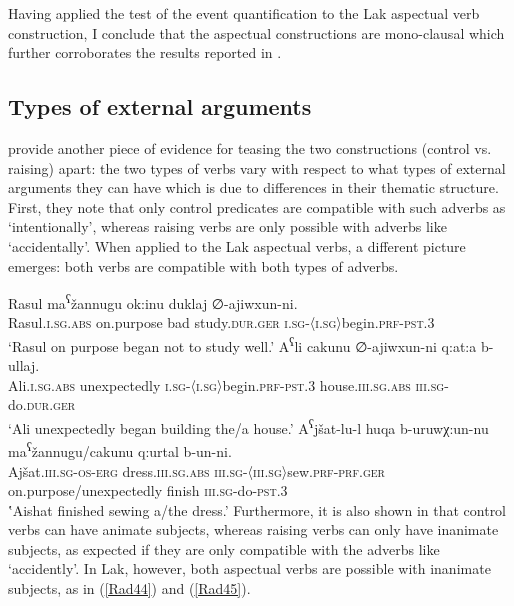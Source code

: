 \documentclass[output=paper]{langscibook}
\begin{document}
Having applied the test of the event quantification to the Lak aspectual verb construction, I conclude that the aspectual constructions are mono-clausal which further corroborates the results reported in .

\subsection{Types of external arguments}
\citet{PolinskyPotsdam2002}  provide another piece of evidence for teasing the two constructions (control vs. raising) apart: the two types of verbs vary with respect to what types of external arguments they can have which is due to differences in their thematic structure. First, they note that only control predicates are compatible with such adverbs as ‘intentionally’, whereas raising verbs are only possible with adverbs like ‘accidentally’. When applied to the Lak aspectual verbs, a different picture emerges: both verbs are compatible with both types of adverbs.

\ea\label{Rad41}
\gll Rasul ma\textsuperscript{ʕ}žannugu ok:inu duklaj	∅-ajiwxun-ni.\\
Rasul.\textsc{i.sg.abs} on.purpose bad study.\textsc{dur.ger} \textsc{i.sg-〈i.sg〉}begin.\textsc{prf-pst.3}\\
\glt ‘Rasul on purpose began not to study well.’
\ex\label{Rad42}
\gll A\textsuperscript{ʕ}li cakunu ∅-ajiwxun-ni q:at:a b-ullaj.\\
Ali.\textsc{i.sg.abs} unexpectedly \textsc{i.sg-〈i.sg〉}begin.\textsc{prf-pst.3} house.\textsc{iii.sg.abs} \textsc{iii.sg}-do.\textsc{dur.ger}\\
\glt ‘Ali unexpectedly began building the/a house.’
\ex\label{Rad43}
\gll A\textsuperscript{ʕ}jšat-lu-l huqa b-uruwχ:un-nu ma\textsuperscript{ʕ}žannugu/cakunu q:urtal b-un-ni.\\
Ajšat.\textsc{iii.sg}-\textsc{os-erg} 	dress.\textsc{iii.sg.abs} \textsc{iii.sg-〈iii.sg〉}sew.\textsc{prf-prf.ger} on.purpose/unexpectedly	finish 	\textsc{iii.sg}-do-\textsc{pst.3}\\	
\glt ‛Aishat finished sewing a/the dress.’
\z 
Furthermore, it is also shown in \citet{PolinskyPotsdam2002} that control verbs can have animate subjects, whereas raising verbs can only have inanimate subjects, as expected if they are only compatible with the adverbs like ‘accidently’. In Lak, however, both aspectual verbs are possible with inanimate subjects, as in (\ref{Rad44}) and (\ref{Rad45}).   
\end{document}
